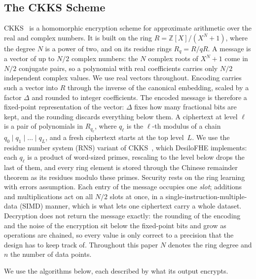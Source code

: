 \subsection{The CKKS Scheme}
\label{sec:ckks}

CKKS~\cite{cheon2017homomorphic} is a homomorphic encryption scheme for
approximate arithmetic over the real and complex numbers. It is built on
the ring
$R = \mathbb{Z}[X]/(X^{N}+1)$, where the degree $N$ is a power of two, and
on its residue rings $R_{q} = R/qR$. A message is a vector of up to $N/2$
complex numbers: the $N$ complex roots of $X^{N}+1$ come in $N/2$
conjugate pairs, so a polynomial with real coefficients carries only
$N/2$ independent complex values. We use real vectors throughout.
Encoding carries such a vector into $R$ through the inverse of the
canonical embedding, scaled by a factor $\Delta$ and rounded to integer
coefficients. The encoded message is therefore a fixed-point
representation of the vector: $\Delta$ fixes how many fractional bits are
kept, and the rounding discards everything below them. A ciphertext at
level $\ell$ is a pair of polynomials in $R_{q_{\ell}}$, where $q_{\ell}$
is the $\ell$-th modulus of a chain
$q_{0} \mid q_{1} \mid \dots \mid q_{L}$, and a fresh ciphertext starts at
the top level~$L$. We use the residue number system (RNS) variant of
CKKS~\cite{cheon2018full}, which DesiloFHE implements: each $q_{\ell}$ is
a product of word-sized primes, rescaling to the level below drops the
last of them, and every ring element is stored through the Chinese
remainder theorem as its residues modulo these primes. Security rests on
the ring learning with errors assumption. Each entry of the message occupies one \emph{slot};
additions and multiplications act on all $N/2$ slots at once, in a
single-instruction-multiple-data (SIMD) manner, which is what lets one
ciphertext carry a whole dataset. Decryption does not return the message
exactly: the rounding of the encoding and the noise of the encryption sit
below the fixed-point bits and grow as operations are chained, so every
value is only correct to a precision that the design has to keep track
of. Throughout this paper $N$ denotes the ring degree and $n$ the number
of data points.

We use the algorithms below, each described by what its output
encrypts.

